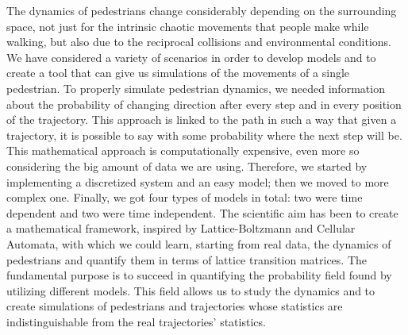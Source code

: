 \documentclass{standalone}
\begin{document}
The dynamics of pedestrians change considerably depending on the surrounding space, not just for the intrinsic chaotic movements that people make while walking, but also due to the reciprocal collisions and environmental conditions. 
We have considered a variety of scenarios in order to develop models and to create a tool that can give us simulations of the movements of a single pedestrian. 
To properly simulate pedestrian dynamics, we needed information about the probability of changing direction after every step and in every position of the trajectory. 
This approach is linked to the path in such a way that given a trajectory, it is possible to say with some probability where the next step will be. 
This mathematical approach is computationally expensive, even more so considering the big amount of data we are using. 
Therefore, we started by implementing a discretized system and an easy model; then we moved to more complex one. 
Finally, we got four types of models in total: two were time dependent and two were time independent. 
The scientific aim has been to create a mathematical framework, inspired by Lattice-Boltzmann and Cellular Automata, with which we could learn, starting from real data, the dynamics of pedestrians and quantify them in terms of lattice transition matrices. 
The fundamental purpose is to succeed in quantifying the probability field found by utilizing different models. 
This field allows us to study the dynamics and to create simulations of pedestrians and trajectories whose statistics are indistinguishable from the real trajectories’ statistics.
\end{document}
